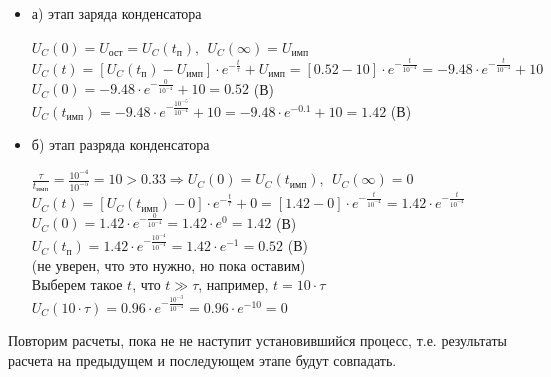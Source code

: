 	\begin{itemize}
\item[] а) этап заряда конденсатора

		$U_C(0) = U_\text{ост} = U_C(t_\text{п}),\ \ U_C(\infty) = U_\text{имп}$\\
		$U_C(t) = [U_C(t_\text{п}) - U_\text{имп}] \cdot e^{-\frac{t}{\tau}} + U_\text{имп} = [0.52 - 10] \cdot e^{-\frac{t}{10^{-4}}} = -9.48 \cdot e^{-\frac{t}{10^{-4}}} + 10$\\
		$U_C(0) = -9.48 \cdot e^{-\frac{0}{10^{-4}}} + 10 = 0.52$ (В)\\
		$U_C(t_\text{имп}) = -9.48 \cdot e^{-\frac{10^{-5}}{10^{-4}}} + 10 = -9.48 \cdot e^{-0.1} + 10 = 1.42$ (В)\\
		
\item[] б) этап разряда конденсатора
	
		$\frac{\tau}{t_\text{имп}} = \frac{10^{-4}}{10^{-5}} = 10 > 0.33 \Rightarrow U_C(0) = U_C(t_\text{имп}),\ \ U_C(\infty) = 0$\\
		$U_C(t) = [U_C(t_\text{имп}) - 0] \cdot e^{-\frac{t}{\tau}} + 0 =  [1.42 - 0] \cdot e^{-\frac{t}{10^{-4}}} = 1.42 \cdot e^{-\frac{t}{10^{-4}}}$\\
		$U_C(0) = 1.42 \cdot e^{-\frac{0}{10^{-4}}} = 1.42 \cdot e^0 = 1.42$ (В)\\
		$U_C(t_\text{п}) = 1.42 \cdot e^{-\frac{10^{-4}}{10^{-4}}} = 1.42 \cdot e^{-1} = 0.52$ (В)\\
		(не уверен, что это нужно, но пока оставим)\\
		Выберем такое $t$, что $t \gg \tau$, например, $t = 10 \cdot \tau$ \\
		$U_C( 10 \cdot \tau) = 0.96 \cdot e^{-\frac{10^{-3}}{10^{-4}}} = 0.96 \cdot e^{-10} = 0$	
		
\end{itemize}

	Повторим расчеты, пока не не наступит установившийся процесс, т.е. результаты расчета на предыдущем и последующем этапе будут совпадать.		
	
